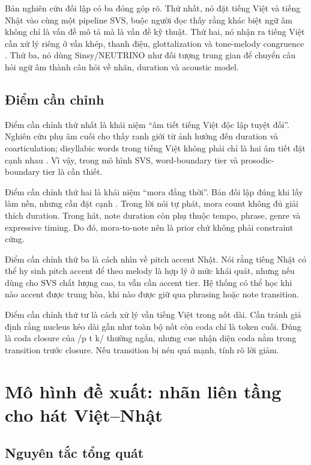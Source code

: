 \documentclass[12pt,a4paper]{article}
\begin{document}
Bản nghiên cứu đối lập có ba đóng góp rõ. Thứ nhất, nó đặt tiếng Việt và tiếng Nhật vào cùng một pipeline SVS, buộc người đọc thấy rằng khác biệt ngữ âm không chỉ là vấn đề mô tả mà là vấn đề kỹ thuật. Thứ hai, nó nhận ra tiếng Việt cần xử lý riêng ở vần khép, thanh điệu, glottalization và tone-melody congruence \parencite{opposingResearch2026}. Thứ ba, nó dùng Sinsy/NEUTRINO như đối tượng trung gian để chuyển câu hỏi ngữ âm thành câu hỏi về nhãn, duration và acoustic model.

\subsection{Điểm cần chỉnh}

Điểm cần chỉnh thứ nhất là khái niệm 
\enquote{âm tiết tiếng Việt độc lập tuyệt đối}. Nghiên cứu phụ âm cuối cho thấy ranh giới từ ảnh hưởng đến duration và coarticulation; disyllabic words trong tiếng Việt không phải chỉ là hai âm tiết đặt cạnh nhau \parencite{tran2019vietnameseCoda}. Vì vậy, trong mô hình SVS, word-boundary tier và prosodic-boundary tier là cần thiết.

Điểm cần chỉnh thứ hai là khái niệm 
\enquote{mora đẳng thời}. Bản đối lập đúng khi lấy \textcite{port1987mora} làm nền, nhưng cần đặt cạnh \textcite{warner2001mora}. Trong lời nói tự phát, mora count không đủ giải thích duration. Trong hát, note duration còn phụ thuộc tempo, phrase, genre và expressive timing. Do đó, mora-to-note nên là prior chứ không phải constraint cứng.

Điểm cần chỉnh thứ ba là cách nhìn về pitch accent Nhật. Nói rằng tiếng Nhật có thể hy sinh pitch accent để theo melody là hợp lý ở mức khái quát, nhưng nếu dùng cho SVS chất lượng cao, ta vẫn cần accent tier. Hệ thống có thể học khi nào accent được trung hòa, khi nào được giữ qua phrasing hoặc note transition.

Điểm cần chỉnh thứ tư là cách xử lý vần tiếng Việt trong nốt dài. Cần tránh giả định rằng nucleus kéo dài gần như toàn bộ nốt còn coda chỉ là token cuối. Đúng là coda closure của /p t k/ thường ngắn, nhưng cue nhận diện coda nằm trong transition trước closure. Nếu transition bị nén quá mạnh, tính rõ lời giảm.

\section{Mô hình đề xuất: nhãn liên tầng cho hát Việt--Nhật}

\subsection{Nguyên tắc tổng quát}
\end{document}
